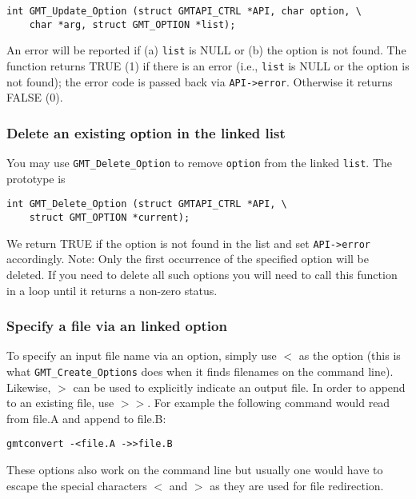\documentclass[11pt]{report}
\begin{document}
\begin{verbatim}
int GMT_Update_Option (struct GMTAPI_CTRL *API, char option, \
    char *arg, struct GMT_OPTION *list);
\end{verbatim}
An error will be reported if (a) \texttt{list} is NULL or (b) the option is not found.
The function returns TRUE (1) if there is an error (i.e., \texttt{list} is NULL or the
option is not found); the error code is passed back via \texttt{API->error}.
Otherwise it returns FALSE (0).

\subsubsection{Delete an existing option in the linked list}

You may use \texttt{GMT\_Delete\_Option} to remove \texttt{option} from
the linked \texttt{list}.  The prototype is

\begin{verbatim}
int GMT_Delete_Option (struct GMTAPI_CTRL *API, \
    struct GMT_OPTION *current);
\end{verbatim}
We return TRUE if the option is not found in the list and set \texttt{API->error} accordingly.
Note: Only the first occurrence of the specified option will be deleted.  If you need to delete all such
options you will need to call this function in a loop until it returns a non-zero
status.

\subsubsection{Specify a file via an linked option}
\index{Option!Files}

To specify an input file name via an option, simply use $<$ as the option (this is what
\texttt{GMT\_Create\_Options} does when it finds filenames on the command line).
Likewise, $>$ can be used to explicitly indicate an output file.  In order to append to
an existing file, use $>>$.  For example the following command would read from file.A
and append to file.B:

\begin{verbatim}
gmtconvert -<file.A ->>file.B
\end{verbatim}

These options also work on the command line but usually one would have to escape the
special characters $<$ and $>$ as they are used for file redirection.
\end{document}
